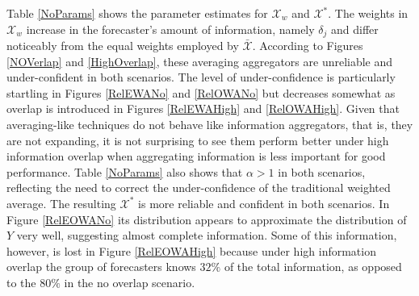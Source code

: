 \documentclass[11pt]{article}
\theoremstyle{definition}
\theoremstyle{definition}
\begin{document}
Table \ref{NoParams} shows the parameter estimates for $\mathcal{X}_w$ and $\mathcal{X}^*$. The weights in $\mathcal{X}_w$ increase in the forecaster's amount of information, namely $\delta_j$ and differ noticeably from the equal weights employed by $\bar{\mathcal{X}}$. According to Figures \ref{NOVerlap} and  \ref{HighOverlap}, these averaging aggregators are unreliable and under-confident in both scenarios. The level of under-confidence is particularly startling in Figures \ref{RelEWANo} and \ref{RelOWANo} but decreases somewhat as overlap is introduced in Figures \ref{RelEWAHigh} and \ref{RelOWAHigh}. Given that averaging-like techniques do not behave like information aggregators, that is, they are not expanding, it is not surprising to see them perform better under high information overlap when aggregating information is less important for good performance. Table \ref{NoParams} also shows that  $\alpha > 1$ in both scenarios, reflecting the need to correct the under-confidence of the traditional weighted average. The resulting $\mathcal{X}^*$ is more reliable and confident in both scenarios.  In Figure \ref{RelEOWANo} its distribution appears to approximate the distribution of $Y$ very well, suggesting  almost complete information. Some of this information, however, is lost in Figure \ref{RelEOWAHigh} because under high information overlap the group of forecasters knows $32\%$ of the total information, as opposed to the $80\%$ in the no overlap scenario.
\end{document}
